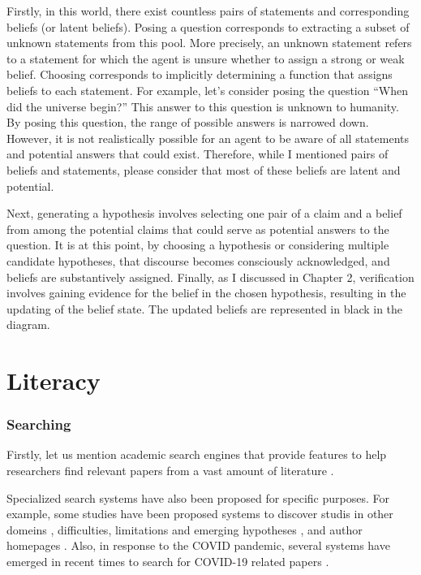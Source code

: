\documentclass{article}
\begin{document}
Firstly, in this world, there exist countless pairs of statements and corresponding beliefs (or latent beliefs). Posing a question corresponds to extracting a subset of unknown statements from this pool. More precisely, an unknown statement refers to a statement for which the agent is unsure whether to assign a strong or weak belief. Choosing corresponds to implicitly determining a function that assigns beliefs to each statement. For example, let's consider posing the question ``When did the universe begin?'' This answer to this question is unknown to humanity. By posing this question, the range of possible answers is narrowed down. However, it is not realistically possible for an agent to be aware of all statements and potential answers that could exist. Therefore, while I mentioned pairs of beliefs and statements, please consider that most of these beliefs are latent and potential.

Next, generating a hypothesis involves selecting one pair of a claim and a belief from among the potential claims that could serve as potential answers to the question. It is at this point, by choosing a hypothesis or considering multiple candidate hypotheses, that discourse becomes consciously acknowledged, and beliefs are substantively assigned. Finally, as I discussed in Chapter 2, verification involves gaining evidence for the belief in the chosen hypothesis, resulting in the updating of the belief state. The updated beliefs are represented in black in the diagram.

\section{Literacy}

\subsubsection{Searching}

Firstly, let us mention academic search engines that provide features to help researchers find relevant papers from a vast amount of literature \cite{googlescholar,semanticscholar,dblp,pubmed,citeseerx}. 

Specialized search systems have also been proposed for specific purposes. For example, some studies have been proposed systems to discover studis in other domeins \cite{kang2022augmenting}, difficulties, limitations and emerging hypotheses \cite{lahav2022search}, and author homepages \cite{patel2021author}. Also, in response to the COVID pandemic, several systems have emerged in recent times to search for COVID-19 related papers \cite{hope2020scisight}.
\end{document}
